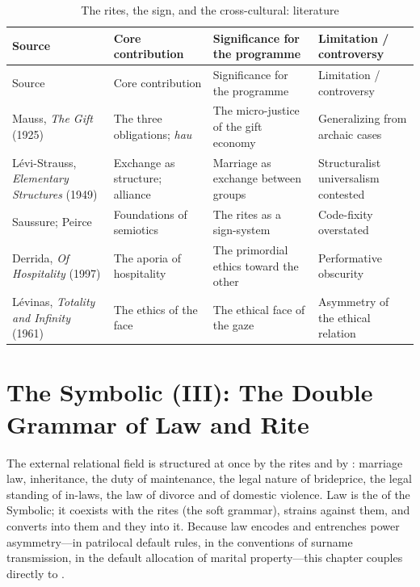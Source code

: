\goldrule
\footnotesize
\begin{longtable}{Y Y Y Y}
\caption{The rites, the sign, and the cross-cultural: literature}\label{p07:tab:rite}\\
\toprule
{}
Source & Core contribution & Significance for the programme & Limitation / controversy \\
\midrule
\endfirsthead
\toprule
{}
Source & Core contribution & Significance for the programme & Limitation / controversy \\
\midrule
\endhead
Mauss, \emph{The Gift} (1925) & The three obligations; \emph{hau} & The micro-justice of the gift economy & Generalizing from archaic cases \\
Lévi-Strauss, \emph{Elementary Structures} (1949) & Exchange as structure; alliance & Marriage as exchange between groups & Structuralist universalism contested \\
Saussure; Peirce & Foundations of semiotics & The rites as a sign-system & Code-fixity overstated \\
Derrida, \emph{Of Hospitality} (1997) & The aporia of hospitality & The primordial ethics toward the other & Performative obscurity \\
Lévinas, \emph{Totality and Infinity} (1961) & The ethics of the face & The ethical face of the gaze & Asymmetry of the ethical relation \\
\bottomrule
\end{longtable}

\section{The Symbolic (III): The Double Grammar of Law and Rite}\label{p07:sec:law}

The external relational field is structured at once by the rites and by : marriage law, inheritance, the duty of maintenance, the legal nature of brideprice, the legal standing of in-laws, the law of divorce and of domestic violence. Law is the  of the Symbolic; it coexists with the rites (the soft grammar), strains against them, and converts into them and they into it. Because law encodes and entrenches power asymmetry---in patrilocal default rules, in the conventions of surname transmission, in the default allocation of marital property---this chapter couples directly to .

